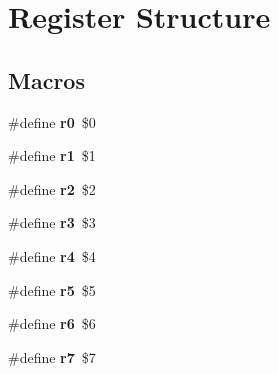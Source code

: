 \hypertarget{group__RTEMSScoreMIPSSet__iregdef}{}\section{Register Structure}
\label{group__RTEMSScoreMIPSSet__iregdef}
\subsection*{Macros}
\begin{DoxyCompactItemize}
\item 
\mbox{\label{group__RTEMSScoreMIPSSet__iregdef_gaf8ef4632fb5325a43f9c31778135d450}} 
\#define {\bfseries r0}~\$0
\item 
\mbox{\label{group__RTEMSScoreMIPSSet__iregdef_ga7eaf5903abe583c64f4324081140b84e}} 
\#define {\bfseries r1}~\$1
\item 
\mbox{\label{group__RTEMSScoreMIPSSet__iregdef_ga0700026d33d910874577324a49997947}} 
\#define {\bfseries r2}~\$2
\item 
\mbox{\label{group__RTEMSScoreMIPSSet__iregdef_gaf0a5572b5ba560a4e4548a2722d3c593}} 
\#define {\bfseries r3}~\$3
\item 
\mbox{\label{group__RTEMSScoreMIPSSet__iregdef_gac2da134ec3ab777999b1d3cb16f35f49}} 
\#define {\bfseries r4}~\$4
\item 
\mbox{\label{group__RTEMSScoreMIPSSet__iregdef_gaf4cf2acff0caa8dcc94f9e94d16d5b0a}} 
\#define {\bfseries r5}~\$5
\item 
\mbox{\label{group__RTEMSScoreMIPSSet__iregdef_ga76535c34ee377a9e0089c24ca39541e1}} 
\#define {\bfseries r6}~\$6
\item 
\mbox{\label{group__RTEMSScoreMIPSSet__iregdef_gaa0ec33834abbd7797aeba23d238eb1f1}} 
\#define {\bfseries r7}~\$7
\item 
\mbox{\label{group__RTEMSScoreMIPSSet__iregdef_ga6f1417813d47c867539dfc6bfbf45925}} 

\end{DoxyCompactItemize}
